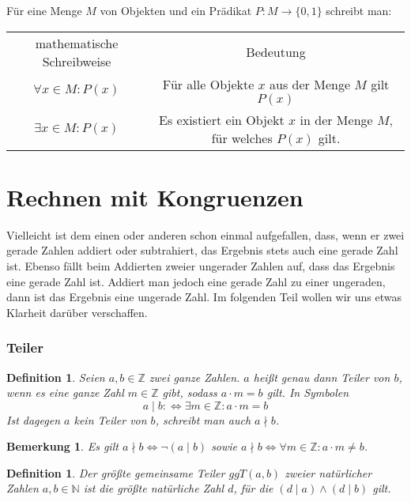 \documentclass[a4paper]{article}
\newtheorem{bemerkung}[satz]{Bemerkung}
\newtheorem{definition}[satz]{Definition} %
\theoremstyle{nonumberplain}
\begin{document}
Für eine Menge $M$ von Objekten und ein Prädikat $P: M \to \lbrace 0,1 \rbrace$ schreibt man:
\begin{center}
\begin{tabular}{cc}
	mathematische Schreibweise & Bedeutung\\
	$\forall x \in M : P(x)$ & Für alle Objekte $x$ aus der Menge $M$ gilt $P(x)$ \\
	$\exists x \in M : P(x)$ & Es existiert ein Objekt $x$ in der Menge $M$, für welches $P(x)$ gilt.
\end{tabular}
\end{center}



\part{Rechnen mit Kongruenzen}

Vielleicht ist dem einen oder anderen schon einmal aufgefallen, dass, wenn er zwei gerade Zahlen addiert oder subtrahiert, das Ergebnis stets auch eine gerade Zahl ist. Ebenso fällt beim Addierten zweier ungerader Zahlen auf, dass das Ergebnis eine gerade Zahl ist. Addiert man jedoch eine gerade Zahl zu einer ungeraden, dann ist das Ergebnis eine ungerade Zahl. Im folgenden Teil wollen wir uns etwas Klarheit darüber verschaffen.

\section{Teiler}

\begin{definition}
Seien $a , b \in \mathbb{Z}$ zwei ganze Zahlen. $a$ heißt genau dann Teiler von $b$, wenn es eine ganze Zahl $m \in \mathbb{Z}$ gibt, sodass $a \cdot m = b$ gilt. In Symbolen
\[ a \mid b : \Leftrightarrow \exists m \in \mathbb{Z} : a \cdot m = b \]
Ist dagegen $a$ kein Teiler von $b$, schreibt man auch $a \nmid b$.
\end{definition}

\begin{bemerkung}
Es gilt $a \nmid b \Leftrightarrow \neg (a \mid b)$ sowie $a \nmid b \Leftrightarrow \forall m \in \mathbb{Z} : a \cdot m \neq b$.
\end{bemerkung}

\begin{definition}
Der größte gemeinsame Teiler $ggT(a,b)$ zweier natürlicher Zahlen $a,b \in \mathbb{N}$ ist die größte natürliche Zahl $d$, für die $(d \mid a) \land (d \mid b)$ gilt.
\end{definition}
\end{document}
